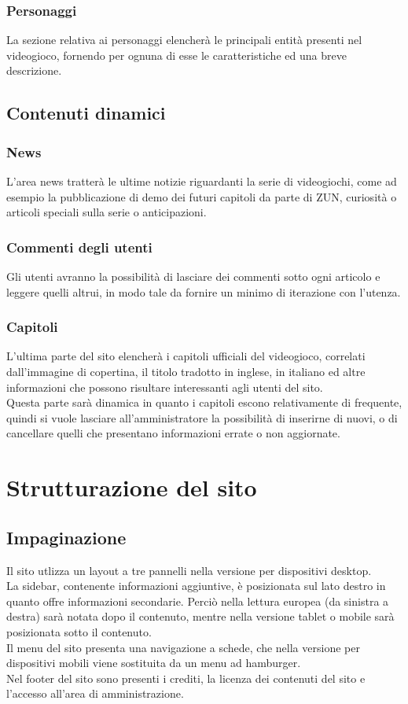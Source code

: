 \documentclass[openany, a4paper, 12pt]{report}
\begin{document}
		\subsubsection{Personaggi}
		La sezione relativa ai personaggi elencherà le principali entità presenti nel videogioco, fornendo per ognuna di esse le caratteristiche ed una breve descrizione.

	\subsection{Contenuti dinamici}
		\subsubsection{News}
		L'area news tratterà le ultime notizie riguardanti la serie di videogiochi, come ad esempio la pubblicazione di demo dei futuri capitoli da parte di ZUN, curiosità o articoli speciali sulla serie o anticipazioni.

		\subsubsection{Commenti degli utenti}
		Gli utenti avranno la possibilità di lasciare dei commenti sotto ogni articolo e leggere quelli altrui, in modo tale da fornire un minimo di iterazione con l'utenza.

		\subsubsection{Capitoli}
		L'ultima parte del sito elencherà i capitoli ufficiali del videogioco, correlati dall'immagine di copertina, il titolo tradotto in inglese, in italiano ed altre informazioni che possono risultare interessanti agli utenti del sito.\\
		Questa parte sarà dinamica in quanto i capitoli escono relativamente di frequente, quindi si vuole lasciare all'amministratore la possibilità di inserirne di nuovi, o di cancellare quelli che presentano informazioni errate o non aggiornate.

	\section{Strutturazione del sito}
	\subsection{Impaginazione}
	Il sito utlizza un layout a tre pannelli nella versione per dispositivi desktop.\\
	La sidebar, contenente informazioni aggiuntive, è posizionata sul lato destro in quanto offre informazioni secondarie. Perciò nella lettura europea (da sinistra a destra) sarà notata dopo il contenuto, mentre nella versione tablet o mobile sarà posizionata sotto il contenuto.\\
	Il menu del sito presenta una navigazione a schede, che nella versione per dispositivi mobili viene sostituita da un menu ad hamburger.\\
	Nel footer del sito sono presenti i crediti, la licenza dei contenuti del sito e l'accesso all'area di amministrazione.
\end{document}
